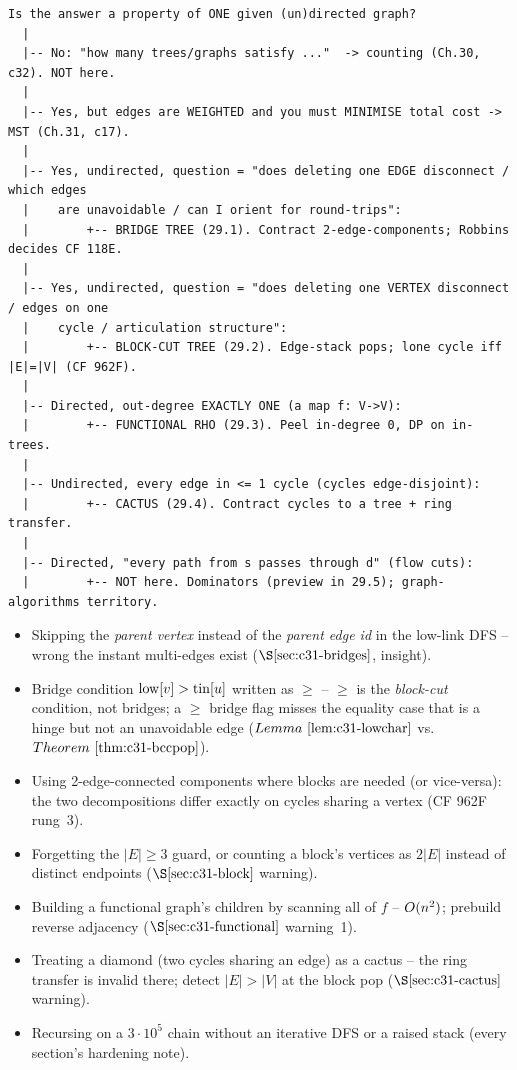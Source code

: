 \begin{lstlisting}[language={}, basicstyle=\ttfamily\small, numbers=none, frame=single]
  Is the answer a property of ONE given (un)directed graph?
  |
  |-- No: "how many trees/graphs satisfy ..."  -> counting (Ch.30, c32). NOT here.
  |
  |-- Yes, but edges are WEIGHTED and you must MINIMISE total cost -> MST (Ch.31, c17).
  |
  |-- Yes, undirected, question = "does deleting one EDGE disconnect / which edges
  |    are unavoidable / can I orient for round-trips":
  |        +-- BRIDGE TREE (29.1). Contract 2-edge-components; Robbins decides CF 118E.
  |
  |-- Yes, undirected, question = "does deleting one VERTEX disconnect / edges on one
  |    cycle / articulation structure":
  |        +-- BLOCK-CUT TREE (29.2). Edge-stack pops; lone cycle iff |E|=|V| (CF 962F).
  |
  |-- Directed, out-degree EXACTLY ONE (a map f: V->V):
  |        +-- FUNCTIONAL RHO (29.3). Peel in-degree 0, DP on in-trees.
  |
  |-- Undirected, every edge in <= 1 cycle (cycles edge-disjoint):
  |        +-- CACTUS (29.4). Contract cycles to a tree + ring transfer.
  |
  |-- Directed, "every path from s passes through d" (flow cuts):
  |        +-- NOT here. Dominators (preview in 29.5); graph-algorithms territory.
\end{lstlisting}


\begin{itemize}[nosep,leftmargin=1.5em]
  \item Skipping the \emph{parent vertex} instead of the \emph{parent edge id} in the
        low-link DFS -- wrong the instant multi-edges exist
        (\(\secref{c31-bridges}\), insight).
  \item Bridge condition \(\mathrm{low}[v]>\operatorname{tin}[u]\) written as \(\ge\) -- \(\ge\) is the
        \emph{block-cut} condition, not bridges; a \(\ge\) bridge flag misses the equality
        case that is a hinge but not an unavoidable edge (\(\lemref{c31-lowchar}\) vs.\
        \(\thmref{c31-bccpop}\)).
  \item Using 2-edge-connected components where blocks are needed (or vice-versa): the two
        decompositions differ exactly on cycles sharing a vertex (CF 962F rung~3).
  \item Forgetting the \(|E|\ge3\) guard, or counting a block's vertices as \(2|E|\)
        instead of distinct endpoints (\(\secref{c31-block}\) warning).
  \item Building a functional graph's children by scanning all of \(f\) -- \(O(n^2)\);
        prebuild reverse adjacency (\(\secref{c31-functional}\) warning~1).
  \item Treating a diamond (two cycles sharing an edge) as a cactus -- the ring transfer is
        invalid there; detect \(|E|>|V|\) at the block pop (\(\secref{c31-cactus}\) warning).
  \item Recursing on a \(3\cdot10^5\) chain without an iterative DFS or a raised stack
        (every section's hardening note).
\end{itemize}

